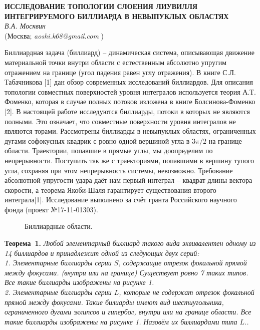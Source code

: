 \begin{center}{ \bf  ИССЛЕДОВАНИЕ ТОПОЛОГИИ СЛОЕНИЯ ЛИУВИЛЛЯ ИНТЕГРИРУЕМОГО БИЛЛИАРДА В НЕВЫПУКЛЫХ ОБЛАСТЯХ}\\
{\it В.А. Москвин } \\
(Москва; {\it aoshi.k68@gmail.com} )
\end{center}

Биллиардная задача (биллиард) -- динамическая система, описывающая движение материальной точки внутри области с естественным абсолютно упругим отражением на границе (угол падения равен углу отражения). В книге С.Л. Табачникова [1] дан обзор современных исследований биллиардов. Для описания топологии совместных поверхностей уровня интегралов используется теория А.Т. Фоменко, которая в случае полных потоков изложена в книге Болсинова-Фоменко [2]. В настоящей работе ис\-следуют\-ся биллиарды, потоки в которых не являются полными. Это означает, что совместные поверхности уровня интегралов не являются торами. Рассмотрены биллиарды в невыпуклых областях, ограниченных дугами софокусных квадрик с ровно одной вершиной угла в $3\pi/2$ на границе области.
Траектории, попавшие в прямые углы, мы доопределим по непрерывности. Поступить так же с траекториями, попавшими в вершину тупого угла, сохраняя при этом непрерывность системы, невозможно.
Требование абсолютной упругости удара даёт нам первый интеграл -- квадрат длины вектора скорости, а теорема Якоби-Шаля гарантирует существования второго интеграла[1]. Исследование выполнено за счёт гранта Российского научного фонда (проект №17-11-01303).

\begin{figure}[h!]
	\caption{Биллиардные области.}
\end{figure}

\textbf{Теорема~1.} {\it 	Любой элементарный биллиард такого вида эквивалентен одному из 14 биллиардов и принадлежит одной из следующих двух серий: \\
	1. Элементарные биллиарды серии $S$, содержащие отрезок фокальной прямой между фокусами. (внутри или на границе) Существует ровно 7 таких типов. Все такие биллиарды изображены на рисунке 1. \\
	2. Элементарные биллиарды серии $L$, которые не содержат отрезок фокальной прямой между фокусами. Такие билиарды имеют вид шестиугольника, ограниченного дугами эллипсов и гипербол, внутри или на границе области. Все такие биллиарды изображены на рисунке 1. Назовём их биллиардами типа $L$..} \\

